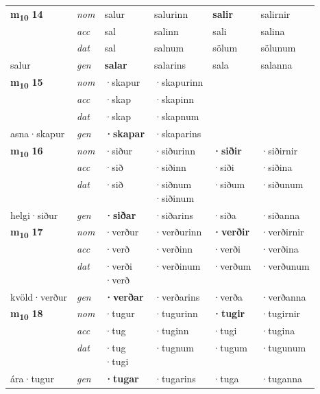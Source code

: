 \begin{longtable}[l]{X>{\footnotesize\itshape}XXXXX}
\multirow{3}{*}{{{\textbf{m{\textsubscript{10}}} \Large{\textbf{14}}}}} & nom & salur & salurinn & \textbf{salir} & salirnir \\*
 & acc & sal & salinn & sali & salina \\*
 & dat & sal & salnum & sölum & sölunum \\*
 {\footnotesize{salur}} & gen & \textbf{salar} & salarins & sala & salanna \\
\cmidrule{1-6}

\multirow{3}{*}{{{\textbf{m{\textsubscript{10}}} \Large{\textbf{15}}}}} & nom & ·skapur & ·skapurinn & \textbf{} &  \\*
 & acc & ·skap & ·skapinn &  &  \\*
 & dat & ·skap & ·skapnum &  &  \\*
 {\footnotesize{asna\allowbreak ·skapur}} & gen & \textbf{·skapar} & ·skaparins &  &  \\
\cmidrule{1-6}

\multirow{3}{*}{{{\textbf{m{\textsubscript{10}}} \Large{\textbf{16}}}}} & nom & ·siður & ·siðurinn & \textbf{·siðir} & ·siðirnir \\*
 & acc & ·sið & ·siðinn & ·siði & ·siðina \\*
 & dat & ·sið & \specialcell{·siðnum\\  ·siðinum} & ·siðum & ·siðunum \\*
 {\footnotesize{helgi\allowbreak ·siður}} & gen & \textbf{·siðar} & ·siðarins & ·siða & ·siðanna \\
\cmidrule{1-6}

\multirow{3}{*}{{{\textbf{m{\textsubscript{10}}} \Large{\textbf{17}}}}} & nom & ·verður & ·verðurinn & \textbf{·verðir} & ·verðirnir \\*
 & acc & ·verð & ·verðinn & ·verði & ·verðina \\*
 & dat & \specialcell{·verði\\  ·verð} & ·verðinum & ·verðum & ·verðunum \\*
 {\footnotesize{kvöld\allowbreak ·verður}} & gen & \textbf{·verðar} & ·verðarins & ·verða & ·verðanna \\
\cmidrule{1-6}

\multirow{3}{*}{{{\textbf{m{\textsubscript{10}}} \Large{\textbf{18}}}}} & nom & ·tugur & ·tugurinn & \textbf{·tugir} & ·tugirnir \\*
 & acc & ·tug & ·tuginn & ·tugi & ·tugina \\*
 & dat & \specialcell{·tug\\  ·tugi} & ·tugnum & ·tugum & ·tugunum \\*
 {\footnotesize{ára\allowbreak ·tugur}} & gen & \textbf{·tugar} & ·tugarins & ·tuga & ·tuganna \\
\cmidrule{1-6}


\end{longtable}
